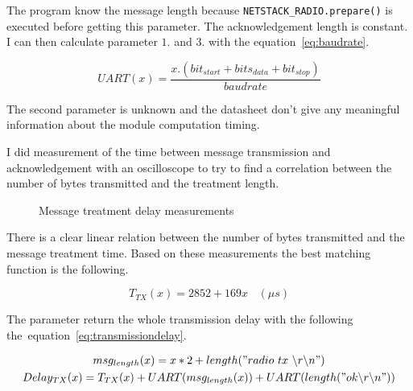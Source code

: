 The program know the message length because
\lstinline{NETSTACK_RADIO.prepare()} is executed before getting this parameter.
The acknowledgement length is constant. 
I can then calculate parameter $1.$ and $3.$ with the equation~\ref{eq:baudrate}.

\begin{equation}
  \label{eq:baudrate}
  UART(x) = \frac{x . (bit_{start} + bits_{data} + bit_{stop})}{baudrate}
\end{equation}

The second parameter is unknown and the datasheet don't give any meaningful
information about the module computation timing.

I did measurement of the time between message transmission and acknowledgement
with an oscilloscope to try to find a correlation between the number of bytes
transmitted and the treatment length.

\begin{figure}[H]
  \centering


  \caption{Message treatment delay measurements\label{fig:transmissiondelay}}
\end{figure}

There is a clear linear relation between the number of bytes transmitted and
the message treatment time.
Based on these measurements the best matching function is the following.

\begin{equation}
  \label{eq:transmissioncompute}
  T_{TX}(x) = 2852 + 169x \ \ \ \ (\mu s)
\end{equation}

The parameter return the whole transmission delay with the following
the~equation~\ref{eq:transmissiondelay}.

\begin{gather}
  \label{eq:transmissiondelay}
  msg_{length}(x) = x * 2 + length("radio~tx~\backslash r \backslash n") \\
  Delay_{TX}(x) = T_{TX}(x) + UART(msg_{length}(x)) + UART(length("ok \backslash r\backslash n"))
\end{gather}

